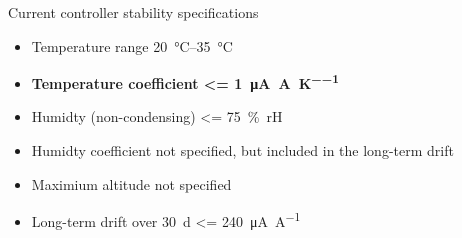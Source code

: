 \begin{center}
    \begin{specifications}[label={lst:dgDrive_specs_environment}]{Current controller stability specifications}
    \begin{itemize}
        \item Temperature range \qtyrange[text-series-to-math, reset-text-series = false, reset-math-version = false, range-phrase=\textup{ to }]{20}{35}{\celsius}
        \item \textbf{Temperature coefficient \qty[text-series-to-math, reset-text-series = false, reset-math-version = false]{<= 1}{\uA \per \A \per \K}}
        \item Humidty (non-condensing) \qty{<= 75}{\percent rH}
        \item Humidty coefficient not specified, but included in the long-term drift
        \item Maximium altitude not specified
        \item Long-term drift over \qty{30}{\day} \qty{<= 240}{\uA \per \A}
    \end{itemize}
    \end{specifications}
\end{center}


\clearpage

